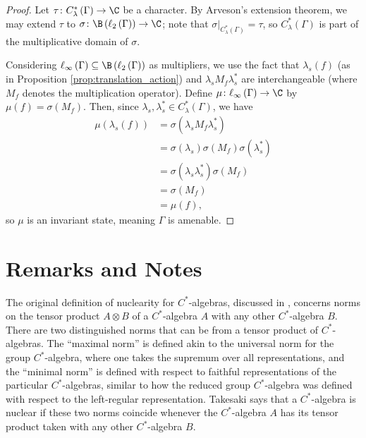 \begin{proof}
  Let $\tau\colon C^{\ast}_{\lambda}\left( \Gamma \right)\rightarrow \C$ be a character. By Arveson's extension theorem, we may extend $\tau$ to $\sigma\colon \B\left( \ell_2\left( \Gamma \right) \right)\rightarrow \C$; note that $\sigma\bigr\vert_{C^{\ast}_{\lambda}\left( \Gamma \right)} = \tau$, so $C^{\ast}_{\lambda}\left( \Gamma \right)$ is part of the multiplicative domain of $\sigma$.\newline

  Considering $\ell_{\infty}\left( \Gamma \right)\subseteq \B\left( \ell_2\left( \Gamma \right) \right)$ as multipliers, we use the fact that $\lambda_s(f) $ (as in Proposition \ref{prop:translation_action}) and $\lambda_sM_f\lambda_s^{\ast}$ are interchangeable (where $M_f$ denotes the multiplication operator). Define $\mu\colon \ell_{\infty}\left( \Gamma \right)\rightarrow \C$ by $\mu(f) = \sigma\left( M_f \right)$. Then, since $\lambda_s,\lambda_s^{\ast}\in C^{\ast}_{\lambda}\left( \Gamma \right)$, we have
  \begin{align*}
    \mu\left( \lambda_s(f) \right) &= \sigma\left( \lambda_sM_f\lambda_s^{\ast} \right)\\
                                   &= \sigma\left( \lambda_s \right)\sigma\left( M_f \right)\sigma\left( \lambda_s^{\ast} \right)\\
                                   &= \sigma\left( \lambda_s\lambda_s^{\ast} \right)\sigma\left( M_f \right)\\
                                   &= \sigma\left( M_f \right)\\
                                   &= \mu\left( f \right),
  \end{align*}
  so $\mu$ is an invariant state, meaning $\Gamma$ is amenable.
\end{proof}

\section{Remarks and Notes}%
The original definition of nuclearity for $C^{\ast}$-algebras, discussed in \cite{cross_norm_takesaki}, concerns norms on the tensor product $A\otimes B$ of a $C^{\ast}$-algebra $A$ with any other $C^{\ast}$-algebra $B$. There are two distinguished norms that can be from a tensor product of $C^{\ast}$-algebras. The ``maximal norm'' is defined akin to the universal norm for the group $C^{\ast}$-algebra, where one takes the supremum over all representations, and the ``minimal norm'' is defined with respect to faithful representations of the particular $C^{\ast}$-algebras, similar to how the reduced group $C^{\ast}$-algebra was defined with respect to the left-regular representation. Takesaki says that a $C^{\ast}$-algebra is nuclear if these two norms coincide whenever the $C^{\ast}$-algebra $A$ has its tensor product taken with any other $C^{\ast}$-algebra $B$.\newline

